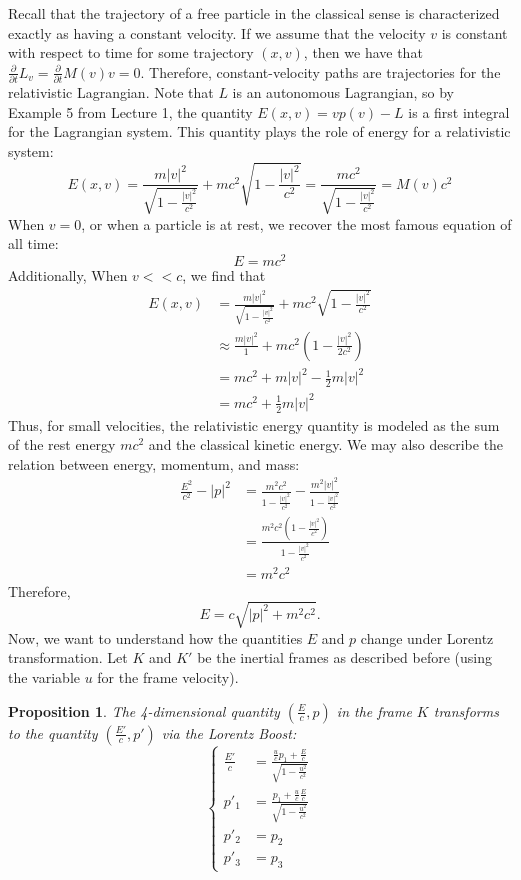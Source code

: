 \documentclass{article}
\newcommand{\nl}{\newline\newline\noindent}
\newcommand{\pd}[1]{\frac{\partial}{\partial #1}}
\newtheorem{prop}{Proposition}
\begin{document}
Recall that the trajectory of a free particle in the classical sense is characterized exactly as having a constant velocity. If we assume that the velocity $v$ is constant with respect to time for some trajectory $(x,v)$, then we have that $\pd{t}L_v = \pd{t}M(v)v  = 0$. Therefore, constant-velocity paths are trajectories for the relativistic Lagrangian.
\nl
Note that $L$ is an autonomous Lagrangian, so by Example 5 from Lecture 1, the quantity $E(x,v) = vp(v) - L$ is a first integral for the Lagrangian system. This quantity plays the role of energy for a relativistic system:
\[E(x,v) = \frac{m|v|^2}{\sqrt{1-\frac{|v|^2}{c^2}}} + mc^2\sqrt{1-\frac{|v|^2}{c^2}} = \frac{mc^2}{\sqrt{1-\frac{|v|^2}{c^2}}} = M(v)c^2\]
When $v=0$, or when a particle is at rest, we recover the most famous equation of all time:
\[E = mc^2\]
Additionally, When $v<<c$, we find that 
\begin{align*}
    E(x,v)&= \frac{m|v|^2}{\sqrt{1-\frac{|v|^2}{c^2}}} + mc^2\sqrt{1-\frac{|v|^2}{c^2}}\\
    &\approx \frac{m|v|^2}{1} + mc^2\left(1-\frac{|v|^2}{2c^2}\right)\\
    &=mc^2 + m|v|^2 - \frac{1}{2}m|v|^2\\
    &=mc^2 + \frac{1}{2}m|v|^2
\end{align*}
Thus, for small velocities, the relativistic energy quantity is modeled as the sum of the rest energy $mc^2$ and the classical kinetic energy. We may also describe the relation between energy, momentum, and mass:
\begin{align*}
    \frac{E^2}{c^2} - |p|^2&= \frac{m^2c^2}{1-\frac{|v|^2}{c^2}} - \frac{m^2|v|^2}{1-\frac{|v|^2}{c^2}}\\
    &=\frac{m^2c^2\left(1-\frac{|v|^2}{c^2}\right)}{1-\frac{|v|^2}{c^2}}\\
    &=m^2c^2
\end{align*}
Therefore, 
\[E = c\sqrt{|p|^2 + m^2c^2}.\]
Now, we want to understand how the quantities $E$ and $p$ change under Lorentz transformation. Let $K$ and $K'$ be the inertial frames as described before (using the variable $u$ for the frame velocity).
\begin{prop}
    The 4-dimensional quantity $\left(\frac{E}{c},p\right)$ in the frame $K$ transforms to the quantity $\left(\frac{E'}{c},p'\right)$ via the Lorentz Boost:
    \[\left\{\begin{aligned}
        \frac{E'}{c}&=\frac{\frac{u}{c}p_1 + \frac{E}{c}}{\sqrt{1-\frac{u^2}{c^2}}}\\
        p'_1&=\frac{p_1+\frac{u}{c} \frac{E}{c}}{\sqrt{1-\frac{u^2}{c^2}}}\\
        p'_2&= p_2\\
        p'_3&= p_3
    \end{aligned}\right.\]
\end{prop}
\end{document}
